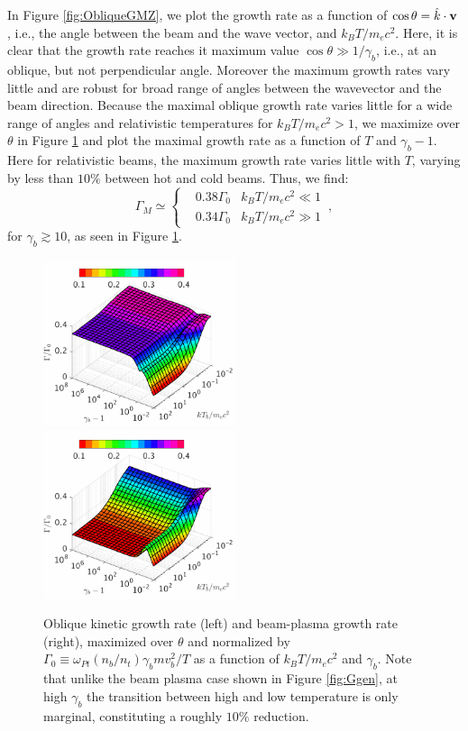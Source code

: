 \documentclass[usenatbib,iop,apj,numberedappendix]{aeb_emulateapj_2015}
\newcommand\bmath[1] {\mbox{\boldmath$\rm #1$}}
\newcommand{\vel}{\ensuremath{\bmath{v}}}
\begin{document}
In Figure \ref{fig:ObliqueGMZ}, we plot the growth rate as a function of $\cos\theta = \hat{k}\cdot\vel$, i.e., the angle between the beam and the wave vector, and $k_BT/m_e c^2$.  Here, it is clear that the growth rate reaches it maximum value $\cos\theta \gg 1/\gamma_b$, i.e., at an oblique, but not perpendicular angle.  Moreover the maximum growth rates vary little and are robust for broad range of angles between the wavevector and the beam direction.  Because the maximal oblique growth rate varies little for a wide range of angles and relativistic temperatures for $k_B T/m_ec^2 > 1$, we maximize over $\theta$ in Figure \ref{fig:OGgen} and plot the maximal growth rate as a function of $T$ and $\gamma_b - 1$.  Here for relativistic beams, the maximum growth rate varies little with $T$, varying by less than $10\%$ between hot and cold beams.  Thus, we find: 
\begin{equation}
\Gamma_M
\simeq
\left\{
\begin{aligned}
& 0.38 \Gamma_0 & k_BT/m_ec^2\ll 1\\
& 0.34 \Gamma_0 & k_BT/m_ec^2\gg 1
\end{aligned}
\right.\,,
\end{equation}
for $\gamma_b\gtrsim10$, as seen in Figure \ref{fig:OGgen}.  

\begin{figure}
\includegraphics[width=0.5\textwidth]{pp2.pdf}
\includegraphics[width=0.5\textwidth]{pp3.pdf}

\caption{Oblique kinetic growth rate (left) and beam-plasma growth rate (right), maximized over $\theta$ and normalized by
  $\Gamma_0\equiv\omega_{Pt}(n_b/n_t)\gamma_b m v_b^2/T$ as a function
  of $k_BT/m_ec^2$ and $\gamma_b$.  Note that unlike the beam
  plasma case shown in Figure \ref{fig:Ggen}, at high $\gamma_b$ the
  transition between high and low temperature is only marginal,
  constituting a roughly $10\%$ reduction.} \label{fig:OGgen}
\end{figure}
\end{document}
